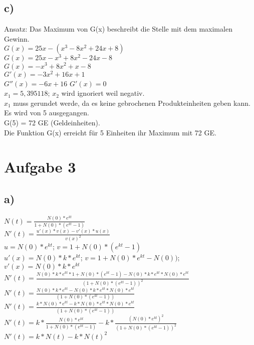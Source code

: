 \documentclass{article}
\begin{document}
	\subsection*{c)}
	Ansatz: Das Maximum von G(x) beschreibt die Stelle mit dem maximalen Gewinn. \\
	$G(x) = 25x -  (x^3 - 8x^2 + 24x + 8)$ \\
	$G(x) = 25x -  x^3 + 8x^2 - 24x - 8$ \\
	$G(x) = -x^3 + 8x^2 + x - 8$ \\
	$G'(x) = -3x^2 + 16x + 1$ \\
	$G''(x) = -6x + 16$
	$G'(x) = 0$ \\
	$x_{1} = 5,395118$; $x_{2}$ wird ignoriert weil negativ. \\
	$x_{1}$ muss gerundet werde, da es keine gebrochenen Produkteinheiten geben kann. Es wird von 5 ausgegangen. \\
	G(5) = 72 GE (Geldeinheiten). \\
	Die Funktion G(x) erreicht für 5 Einheiten ihr Maximum mit 72 GE.
	\section*{Aufgabe 3}
	\subsection*{a)}
	$N(t) = \frac{N(0)*e^{kt}}{1 + N(0)*(e^{kt} - 1)}$ \\
	$N'(t) = \frac{u'(x) * v(x) - v'(x) * u(x)}{v(x)^2}$ \\
	$u = N(0) * e^{kt}$; $v = 1 + N(0)*(e^{kt}-1)$ \\
	$u'(x) = N(0) * k * e^{kt}$; $v = 1 + N(0) * e^{kt} - N(0))$; $v'(x) = N(0) * k * e^{kt}$ \\
	$N'(t) = \frac{N(0) * k * e^{kt} * 1 + N(0)*(e^{kt}-1) - N(0) * k * e^{kt} * N(0) * e^{kt}}{(1 + N(0)*(e^{kt}-1))^2}$ \\
	$N'(t) = \frac{N(0) * k * e^{kt} - N(0) * k * e^{kt} * N(0) * e^{kt}}{(1 + N(0)*(e^{kt}-1))}$ \\
	$N'(t) = \frac{k * N(0) * e^{kt} - k * N(0) *e^{kt} * N(0) * e^{kt}}{(1 + N(0)*(e^{kt}-1))}$ \\
	$N'(t) = k * \frac{N(0)*e^{kt}}{1+N(0)*(e^{kt}-1)} - k *  \frac{(N(0)*e^{kt})^2}{(1+N(0)*(e^{kt}-1))^2}$ \\
	$N'(t) = k * N(t) - k * N(t)^2$
\end{document}

